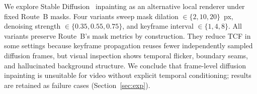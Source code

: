 We explore Stable Diffusion~\cite{ldm} inpainting as an alternative local renderer under
fixed Route~B masks. Four variants sweep mask dilation $\in\{2,10,20\}$~px, denoising
strength $\in\{0.35,0.55,0.75\}$, and keyframe interval $\in\{1,4,8\}$.
All variants preserve Route~B's mask metrics by construction. They reduce TCF in some
settings because keyframe propagation reuses fewer independently sampled diffusion
frames, but visual inspection shows temporal flicker, boundary seams, and hallucinated
background structure.
We conclude that frame-level diffusion inpainting is unsuitable for video without
explicit temporal conditioning; results are retained as failure cases
(Section~\ref{sec:exp}).
